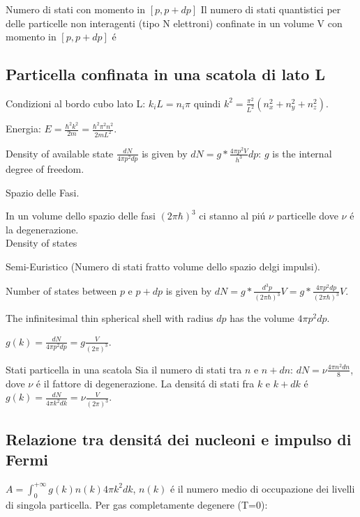 \begin{usefull}{Numero di stati con momento in $[p,p+dp]$}
Il numero di stati quantistici per delle particelle non interagenti (tipo N elettroni) confinate in un volume V con momento in $[p,p+dp]$ \'e 
\end{usefull}

\subsection{Particella confinata in una scatola di lato L}

Condizioni al bordo cubo lato L: $k_iL=n_i \pi $ quindi $k^2=\frac{\pi^2}{L^2}(n_x^2+n_y^2+n_z^2)$.

Energia: $E=\frac{\hbar^2k^2}{2m}=\frac{\hbar^2\pi^2n^2}{2mL^2}$.

Density of available state $\frac{dN}{4\pi p^2dp}$ is given by $dN=g*\frac{4\pi p^2V}{h^3}dp$: $g$ is the internal degree of freedom.

Spazio delle Fasi.

In un volume dello spazio delle fasi $(2\pi\hbar)^3$ ci stanno al pi\'u $\nu$ particelle dove $\nu$ \'e la degenerazione.\\

Density of states

Semi-Euristico (Numero di stati fratto volume dello spazio delgi impulsi).

Number of states between $p$ e $p+dp$ is given by $dN=g*\frac{d^3p}{(2\pi\hbar)^3}V=g*\frac{4\pi p^2dp}{(2\pi\hbar)^3}V$.

The infinitesimal thin spherical shell with radius $dp$ has the volume $4\pi p^2dp$.

$g(k)=\frac{dN}{4\pi p^2dp}=g\frac{V}{(2\pi)^3}$.\\

\begin{usefull}{Stati particella in una scatola}
Sia il numero di stati tra $n$ e $n+dn$: $dN=\nu \frac{4\pi n^2dn}{8}$, dove $\nu$ \'e il fattore di degenerazione. La densit\'a di stati fra $k$ e $k+dk$ \'e $g(k)=\frac{dN}{4\pi k^2dk}=\nu \frac{V}{(2\pi)^3}$.\\

\end{usefull}

\subsection{Relazione tra densit\'a dei nucleoni e impulso di Fermi}
$A=\int_0^{+\infty}g(k)n(k)4\pi k^2dk$, $n(k)$ \'e il numero medio di occupazione dei livelli di singola particella. Per gas completamente degenere (T=0):

